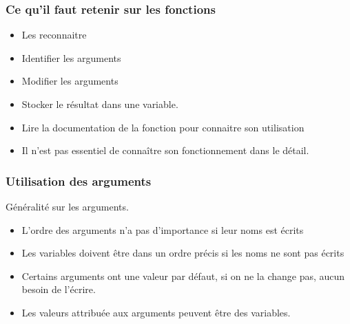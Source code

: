 \documentclass[handout, table,svgnames,hyperref={pdfpagemode=FullScreen}]{beamer}
\begin{document}
\begin{frame}
	\frametitle{Ce qu'il faut retenir sur les fonctions}
	\begin{itemize}
	\item Les reconnaitre
	\item Identifier les arguments 
	\item Modifier les arguments
	\item Stocker le résultat dans une variable.
	\item Lire la documentation de la fonction pour connaitre son utilisation
	\item Il n'est pas essentiel de connaître son fonctionnement dans le détail.  
\end{itemize}
\end{frame}
\begin{frame}
	\frametitle{Utilisation des arguments}
	
	Généralité sur les arguments.
	\begin{itemize}
		\item L'ordre des arguments n'a pas d'importance si leur noms est écrits
		\item  Les variables doivent être dans un ordre précis si les noms ne sont pas écrits
		\item  Certains arguments ont une valeur par défaut, si on ne la change pas, aucun besoin de l'écrire.
		\item  Les valeurs attribuée aux arguments peuvent être des variables.
	\end{itemize}
	\end{frame}
		
\end{document}
